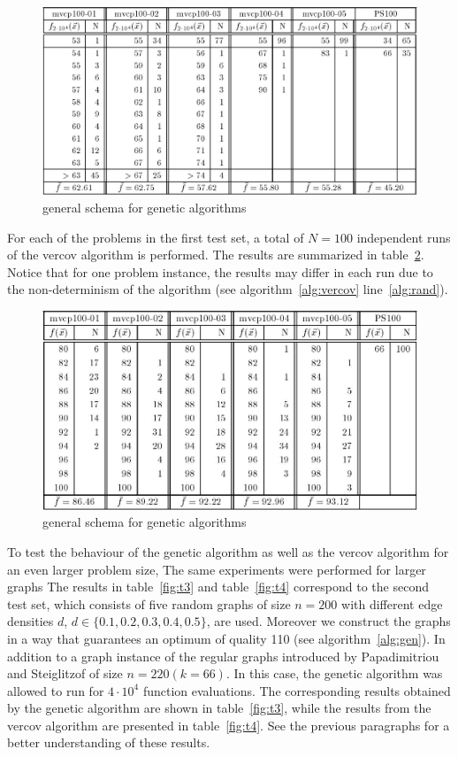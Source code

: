 \documentclass[12pt]{article}
\begin{document}
\begin{figure}[!htbp]
\centering
\includegraphics[width=1\textwidth]{t1}
\caption{general schema for genetic algorithms}
\label{fig:t1}
\end{figure}

For each of the problems in the first test set, a total of $N=100$
independent runs of the vercov algorithm is performed. The results are summarized in table~\ref{fig:t2}.
Notice that for one problem instance, the results may differ in each run due to the
non-determinism of the algorithm (see algorithm~\ref{alg:vercov} line~\ref{alg:rand}).

\begin{figure}[!htbp]
\centering
\includegraphics[width=1\textwidth]{t2}
\caption{general schema for genetic algorithms}
\label{fig:t2}
\end{figure}

To test the behaviour of the genetic algorithm
as well as the vercov algorithm for an even
larger problem size, The same experiments were performed for larger graphs
The results in table~\ref{fig:t3}
and table~\ref{fig:t4} correspond to the second test set, which consists of
five random graphs of size $n = 200$ with different
edge densities $d$, $d \in \{0.1, 0.2, 0.3, 0.4, 0.5\}$, are used.
Moreover we construct the graphs in a way that guarantees an optimum of quality 110
(see algorithm~\ref{alg:gen}).
In addition to a graph instance of the regular graphs introduced by
Papadimitriou and Steiglitzof of size $n = 220 (k=66)$.
In this case, the genetic algorithm
was allowed to run for $4 \cdot 10^4$ function evaluations.
The corresponding results obtained by the
genetic algorithm are shown in table~\ref{fig:t3}, while the results
from the vercov algorithm are presented in table~\ref{fig:t4}.
See the previous paragraphs for a better understanding of these results.
\end{document}
